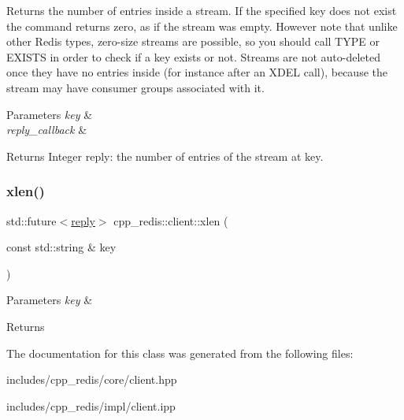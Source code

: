 Returns the number of entries inside a stream. If the specified key does not exist the command returns zero, as if the stream was empty. However note that unlike other Redis types, zero-\/size streams are possible, so you should call T\+Y\+PE or E\+X\+I\+S\+TS in order to check if a key exists or not. Streams are not auto-\/deleted once they have no entries inside (for instance after an X\+D\+EL call), because the stream may have consumer groups associated with it.


\begin{DoxyParams}{Parameters}
{\em key} & \\
\hline
{\em reply\+\_\+callback} & \\
\hline
\end{DoxyParams}
\begin{DoxyReturn}{Returns}
Integer reply\+: the number of entries of the stream at key. 
\end{DoxyReturn}
\mbox{\label{classcpp__redis_1_1client_a688bed690967583c3aa6a7d72c8c03f9}} 
\subsubsection{\texorpdfstring{xlen()}{xlen()}\hspace{0.1cm}{\footnotesize\ttfamily [2/2]}}
{\footnotesize\ttfamily std\+::future$<$\mbox{\hyperlink{classcpp__redis_1_1reply}{reply}}$>$ cpp\+\_\+redis\+::client\+::xlen (\begin{DoxyParamCaption}\item[{const std\+::string \&}]{key }\end{DoxyParamCaption})}






\begin{DoxyParams}{Parameters}
{\em key} & \\
\hline
\end{DoxyParams}
\begin{DoxyReturn}{Returns}

\end{DoxyReturn}


The documentation for this class was generated from the following files\+:\begin{DoxyCompactItemize}
\item 
includes/cpp\+\_\+redis/core/client.\+hpp\item 
includes/cpp\+\_\+redis/impl/client.\+ipp\end{DoxyCompactItemize}
